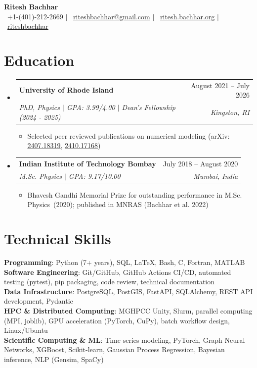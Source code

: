 \documentclass[letterpaper,11pt]{article}
\makeatletter
\newcommand{\resumeItem}[1]{
  \item\small{
    {#1 \vspace{-3pt}}
  }
}
\newcommand{\resumeSubheading}[4]{
  \vspace{-2pt}\item
    \begin{tabular*}{0.97\textwidth}[t]{l@{\extracolsep{\fill}}r}
      \textbf{#1} & #2 \\
      \textit{\small#3} & \textit{\small #4} \\
    \end{tabular*}\vspace{-14pt}
}
\newcommand{\resumeSubHeadingListStart}{\begin{itemize}[leftmargin=0.1in, label={}]}
\newcommand{\resumeSubHeadingListEnd}{\end{itemize}}
\newcommand{\resumeItemListStart}{\begin{itemize}[leftmargin=0.2in]\vspace{5pt}}
\newcommand{\resumeItemListEnd}{\end{itemize}\vspace{-5pt}}
\makeatother
\begin{document}
\begin{center}
    \textbf{\Huge Ritesh Bachhar} \\ \vspace{1pt}
    \small \faPhone\ +1-(401)-212-2669 $|$ \faEnvelope\ \href{mailto:riteshbachhar@gmail.com}{\underline{riteshbachhar@gmail.com}} $|$
    \faGlobe\ \href{https://ritesh.bachhar.org}{\underline{ritesh.bachhar.org}} $|$
    \faGithub\ \href{https://github.com/riteshbachhar}{\underline{riteshbachhar}}
\end{center}


\section{Education}
  \resumeSubHeadingListStart
    \resumeSubheading
      {University of Rhode Island}{August 2021 -- July 2026}
      {PhD, Physics $|$ GPA: 3.99/4.00 $|$ Dean's Fellowship (2024 - 2025)}{Kingston, RI}
      \resumeItemListStart
        \resumeItem{Selected peer reviewed publications on numerical modeling 
        (arXiv: \href{https://arxiv.org/abs/2407.18319}{\underline{2407.18319}}, 
        \href{https://arxiv.org/abs/2410.17168}{\underline{2410.17168}})}
      \resumeItemListEnd
    \resumeSubheading
      {Indian Institute of Technology Bombay}{July 2018 -- August 2020}
      {M.Sc. Physics $|$ GPA: 9.17/10.00}{Mumbai, India}
      \resumeItemListStart
        \resumeItem{Bhavesh Gandhi Memorial Prize for outstanding performance in M.Sc. Physics~(2020); published in MNRAS (Bachhar et al. 2022)}
      \resumeItemListEnd
  \resumeSubHeadingListEnd

\section{Technical Skills}
 \begin{itemize}[leftmargin=0.1in, label={}]
    \small{\item{
     \textbf{Programming}{: Python (7+ years), SQL, \LaTeX, Bash, C, Fortran, MATLAB} \\
     \textbf{Software Engineering}{: Git/GitHub, GitHub Actions CI/CD, automated testing (pytest), pip packaging, code review, technical documentation} \\
     \textbf{Data Infrastructure}{: PostgreSQL, PostGIS, FastAPI, SQLAlchemy, REST API development, Pydantic} \\
     \textbf{HPC \& Distributed Computing}{: MGHPCC Unity, Slurm, parallel computing (MPI, joblib), GPU acceleration (PyTorch, CuPy), batch workflow design, Linux/Ubuntu} \\
     \textbf{Scientific Computing \& ML}{: Time-series modeling, PyTorch, Graph Neural Networks, XGBoost, Scikit-learn, Gaussian Process Regression, Bayesian inference, NLP (Gensim, SpaCy)}
    }}
 \end{itemize}
\end{document}
